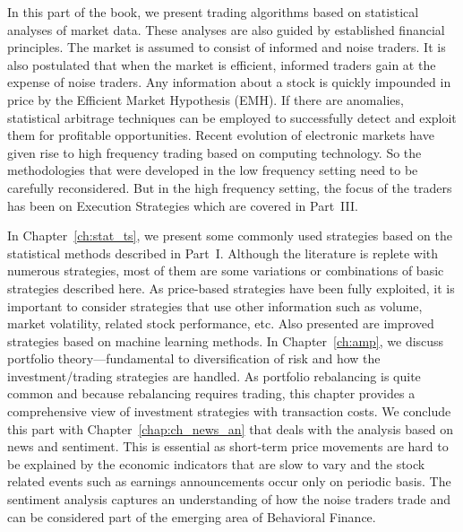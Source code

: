 
In this part of the book, we present trading algorithms based on statistical analyses of market data. These analyses are also guided by established financial principles. The market is assumed to consist of informed and noise traders. It is also postulated that when the market is efficient, informed traders gain at the expense of noise traders. Any information about a stock is quickly impounded in price by the Efficient Market Hypothesis (EMH). If there are anomalies, statistical arbitrage techniques can be employed to successfully detect and exploit them for profitable opportunities. Recent evolution of electronic markets have given rise to high frequency trading based on computing technology. So the methodologies that were developed in the low frequency setting need to be carefully reconsidered. But in the high frequency setting, the focus of the traders has been on Execution Strategies which are covered in Part~III.


In Chapter~\ref{ch:stat_ts}, we present some commonly used strategies based on the statistical methods described in Part~I. Although the literature is replete with numerous strategies, most of them are some variations or combinations of basic strategies described here. As price-based strategies have been fully exploited, it is important to consider strategies that use other information such as volume, market volatility, related stock performance, etc. Also presented are improved strategies based on machine learning methods. In Chapter~\ref{ch:amp}, we discuss portfolio theory---fundamental to diversification of risk and how the investment/trading strategies are handled. As portfolio rebalancing is quite common and because rebalancing requires trading, this chapter provides a comprehensive view of investment strategies with transaction costs. We conclude this part with Chapter~\ref{chap:ch_news_an} that deals with the analysis based on news and sentiment. This is essential as short-term price movements are hard to be explained by the economic indicators that are slow to vary and the stock related events such as earnings announcements occur only on periodic basis. The sentiment analysis captures an understanding of how the noise traders trade and can be considered part of the emerging area of Behavioral Finance. 